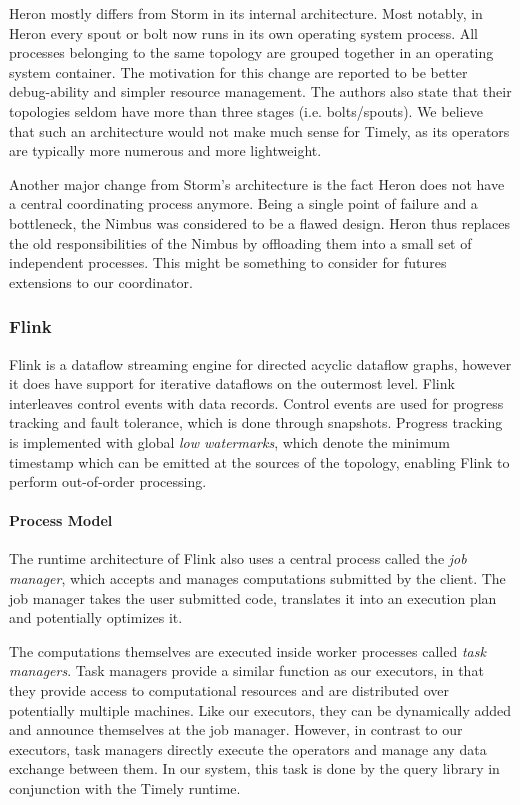 Heron mostly differs from Storm in its internal architecture. Most notably, in
Heron every spout or bolt now runs in its own operating system process. All processes
belonging to the same topology are grouped together in an operating system container.
The motivation for this change are reported to be better debug-ability
and simpler resource management. The authors also state that their topologies
seldom have more than three stages (i.e. bolts/spouts). We believe that such
an architecture would not make much sense for Timely, as its operators are typically
more numerous and more lightweight.

Another major change from Storm's architecture
is the fact Heron does not have a central coordinating process anymore. Being
a single point of failure and a bottleneck, the Nimbus was considered to be a
flawed design. Heron thus replaces the old responsibilities of the Nimbus by
offloading them into a small set of independent processes. This might be something
to consider for futures extensions to our coordinator.

\subsubsection{Flink}

Flink \cite{flink} is a dataflow streaming engine for directed acyclic
dataflow graphs, however it does have support for iterative dataflows on the
outermost level. Flink interleaves control events with data records. Control
events are used for progress tracking and fault tolerance, which is done through
snapshots. Progress tracking is implemented with global \emph{low watermarks}, which
denote the minimum timestamp which can be emitted at the sources of the
topology, enabling Flink to perform out-of-order processing.

\paragraph{Process Model}

The runtime architecture of Flink also uses a central process called the
\emph{job manager}, which accepts and manages computations submitted by
the client. The job manager takes the user submitted code, translates it into
an execution plan and potentially optimizes it.

The computations themselves are executed inside worker processes called
\emph{task managers}. Task managers provide a similar function as our executors, in that
they provide access to computational resources and are distributed over
potentially multiple machines. Like our executors, they can be dynamically added and announce themselves at the
job manager. However, in contrast to our executors, task managers directly execute the
operators and manage any data exchange between them. In our system, this task is done by the
query library in conjunction with the Timely runtime.

